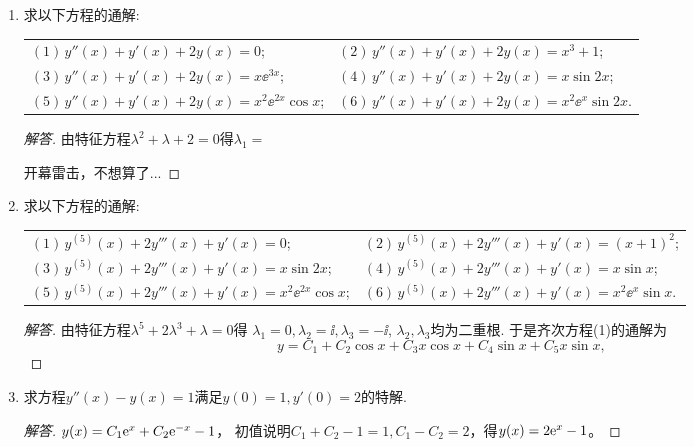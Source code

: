 \begin{3a}
\begin{enumerate}
\begin{proof}[解答]
(2) \(y^*=\left(\frac{1}{\DD-2}\right)^2x
=\frac{1}{4}(1+\DD)x=\frac{1}{4}x+\frac{1}{4}.\)

(3) \(y^*=\left(\frac{1}{\DD-2}\right)^2x\ee^{3x}
=\ee^{3x}\left(\frac{1}{\DD+1}\right)^2x
=\ee^{3x}(1-2\DD)x=\left(x-2\right)\ee^{3x}.\)

(4) \(y^*=\left(\frac{1}{\DD-2}\right)^2x\ee^{2x}
=\ee^{2x}\frac{1}{\DD^2}x=\frac{1}{6}x^3\ee^{2x}.\)
\end{proof}

\item 求以下方程的通解:
\begin{center}\begin{tabular}{ll}
\((1)\,y''(x)+y'(x)+2y(x)=0\);&\((2)\,y''(x)+y'(x)+2y(x)=x^3+1\);\\
\((3)\,y''(x)+y'(x)+2y(x)=x\ee^{3x}\);&\((4)\,y''(x)+y'(x)+2y(x)=x\sin 2x\);\\
\((5)\,y''(x)+y'(x)+2y(x)=x^2\ee^{2x}\cos x\);&\((6)\,y''(x)+y'(x)+2y(x)=x^2\ee^{x}\sin 2x\).
\end{tabular}\end{center}
\begin{proof}[解答]
由特征方程\(\lambda^2+\lambda+2=0\)得\(\lambda_1=\)

开幕雷击，不想算了...
\end{proof}


\item 求以下方程的通解:
\begin{center}\begin{tabular}{ll}
\((1)\,y^{(5)}(x)+2y'''(x)+y'(x)=0\);&\((2)\,y^{(5)}(x)+2y'''(x)+y'(x)=(x+1)^2\);\\
\((3)\,y^{(5)}(x)+2y'''(x)+y'(x)=x\sin 2x\);&\((4)\,y^{(5)}(x)+2y'''(x)+y'(x)=x\sin x\);\\
\((5)\,y^{(5)}(x)+2y'''(x)+y'(x)=x^2\ee^{2x}\cos x\);&\((6)\,y^{(5)}(x)+2y'''(x)+y'(x)=x^2\ee^x\sin x\).
\end{tabular}\end{center}
\begin{proof}[解答]
由特征方程\(\lambda^5+2\lambda^3+\lambda=0\)得
\(\lambda_1=0,\lambda_2=\ii,\lambda_3=-\ii\), \(\lambda_2,\lambda_3\)均为二重根. 
于是齐次方程(1)的通解为\[y=C_1+C_2\cos x+C_3x\cos x+C_4\sin x+C_5x\sin x,\]
\end{proof}

\item 求方程\(y''(x)-y(x)=1\)满足\(y(0)=1,y'(0)=2\)的特解.
\begin{proof}[解答]
    $y(x)=C_1{\rm e}^x+C_2{\rm e}^{-x}-1$，
    初值说明$C_1+C_2-1=1,C_1-C_2=2$，得$y(x)=2{\rm e}^x-1$。
\end{proof}


\end{enumerate}
\end{3a}
